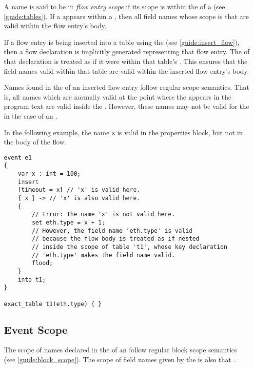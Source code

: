 A name is said to be in \textit{flow entry scope} if its scope is within the  of a  (see \ref{guide:tables}). If a  appears within a , then all field names whose scope is that  are valid within the flow entry's body.

If a flow entry is being inserted into a table using the  (see \ref{guide:insert_flow}), then a flow declaration is implicitly generated representing that flow entry. The  of that declaration is treated as if it were within that table's . This ensures that the field names valid within that table are valid within the inserted flow entry's body.

Names found in the  of an inserted flow entry follow regular scope semantics. That is, all names which are normally valid at the point where the  appears in the program text are valid inside the . However, these names may not be valid for the  in the case of an .

In the following example, the name \texttt{x} is valid in the properties block, but not in the body of the flow.

\begin{minip}
\begin{lstlisting}
event e1
{
	var x : int = 100;
	insert
	[timeout = x] // 'x' is valid here.
	{ x } -> // 'x' is also valid here.
	{
		// Error: The name 'x' is not valid here.
		set eth.type = x + 1;
		// However, the field name 'eth.type' is valid
		// because the flow body is treated as if nested
		// inside the scope of table 't1', whose key declaration
		// 'eth.type' makes the field name valid.
		flood;
	}
	into t1;
}

exact_table t1(eth.type) { }
\end{lstlisting}
\end{minip}

\subsection{Event Scope} \label{guide:event_scope}

The scope of names declared in the  of an  follow regular block scope semantics (see \ref{guide:block_scope}). The scope of field names given by the  is also that .

